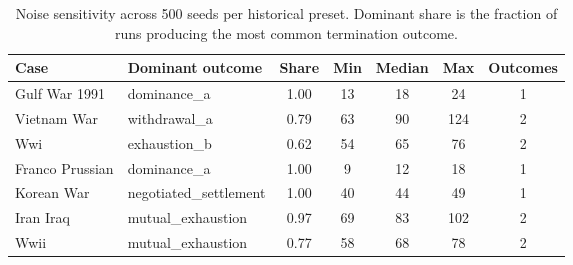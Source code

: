 \begin{table}[H]
\centering
\caption{Noise sensitivity across 500 seeds per historical preset. Dominant share is the fraction of runs producing the most common termination outcome.}
\label{tab:noise_sensitivity}
\small
\begin{tabularx}{\textwidth}{@{}>{\RaggedRight\arraybackslash}X l c c c c c@{}}
\toprule
\textbf{Case} & \textbf{Dominant outcome} & \textbf{Share} & \textbf{Min} & \textbf{Median} & \textbf{Max} & \textbf{Outcomes} \\
\midrule
Gulf War 1991 & dominance\_a & 1.00 & 13 & 18 & 24 & 1 \\
Vietnam War & withdrawal\_a & 0.79 & 63 & 90 & 124 & 2 \\
Wwi & exhaustion\_b & 0.62 & 54 & 65 & 76 & 2 \\
Franco Prussian & dominance\_a & 1.00 & 9 & 12 & 18 & 1 \\
Korean War & negotiated\_settlement & 1.00 & 40 & 44 & 49 & 1 \\
Iran Iraq & mutual\_exhaustion & 0.97 & 69 & 83 & 102 & 2 \\
Wwii & mutual\_exhaustion & 0.77 & 58 & 68 & 78 & 2 \\
\bottomrule
\end{tabularx}
\end{table}
